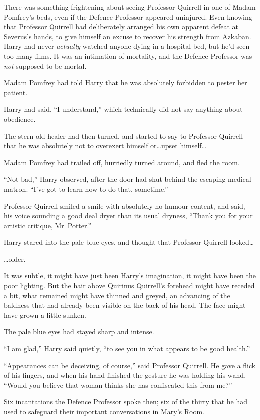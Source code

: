 There was something frightening about seeing Professor Quirrell in one of Madam Pomfrey’s beds, even if the Defence Professor appeared uninjured. Even knowing that Professor Quirrell had deliberately arranged his own apparent defeat at Severus’s hands, to give himself an excuse to recover his strength from Azkaban. Harry had never \emph{actually} watched anyone dying in a hospital bed, but he’d seen too many films. It was an intimation of mortality, and the Defence Professor was \emph{not} supposed to be mortal.

Madam Pomfrey had told Harry that he was absolutely forbidden to pester her patient.

Harry had said, “I understand,” which technically did not say anything about obedience.

The stern old healer had then turned, and started to say to Professor Quirrell that he was absolutely not to overexert himself or…upset himself…

Madam Pomfrey had trailed off, hurriedly turned around, and fled the room.

“Not bad,” Harry observed, after the door had shut behind the escaping medical matron. “I’ve got to learn how to do that, sometime.”

Professor Quirrell smiled a smile with absolutely no humour content, and said, his voice sounding a good deal dryer than its usual dryness, “Thank you for your artistic critique, Mr~Potter.”

Harry stared into the pale blue eyes, and thought that Professor Quirrell looked…

…older.

It was subtle, it might have just been Harry’s imagination, it might have been the poor lighting. But the hair above Quirinus Quirrell’s forehead might have receded a bit, what remained might have thinned and greyed, an advancing of the baldness that had already been visible on the back of his head. The face might have grown a little sunken.

The pale blue eyes had stayed sharp and intense.

“I am glad,” Harry said quietly, “to see you in what appears to be good health.”

“Appearances can be deceiving, of course,” said Professor Quirrell. He gave a flick of his fingers, and when his hand finished the gesture he was holding his wand. “Would you believe that woman thinks she has confiscated this from me?”

Six incantations the Defence Professor spoke then; six of the thirty that he had used to safeguard their important conversations in Mary’s Room.

